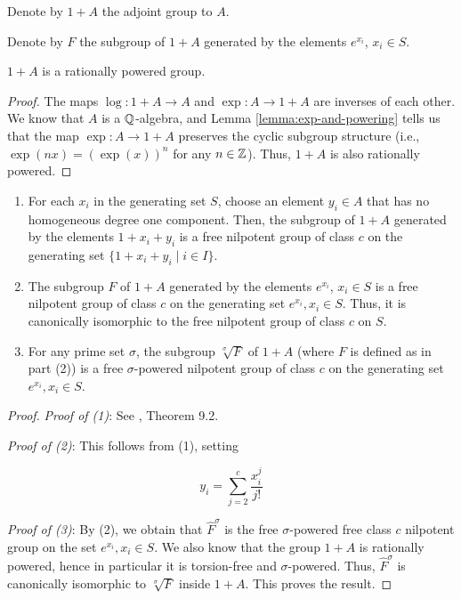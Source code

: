 Denote by $1 + A$ the adjoint group to $A$.

Denote by $F$ the subgroup of $1 + A$ generated by the elements
$e^{x_i}$, $x_i \in S$.

\begin{lemma}
  $1 + A$ is a rationally powered group.
\end{lemma}

\begin{proof}
  The maps $\log:1 + A \to A$ and $\exp:A \to 1 + A$ are inverses of
  each other. We know that $A$ is a $\mathbb{Q}$-algebra, and Lemma
  \ref{lemma:exp-and-powering} tells us that the map $\exp:A \to 1 +
  A$ preserves the cyclic subgroup structure (i.e., $\exp(nx) =
  (\exp(x))^n$ for any $n \in \mathbb{Z}$). Thus, $1 + A$ is also rationally
  powered.
\end{proof}
  
\begin{theorem}\label{thm:free-nilpotent}
  \begin{enumerate}
  \item For each $x_i$ in the generating set $S$, choose an element $y_i
    \in A$ that has no homogeneous degree one component. Then, the
    subgroup of $1 + A$ generated by the elements $1 + x_i + y_i$ is a
    free nilpotent group of class $c$ on the generating set $\{ 1 +
    x_i + y_i \mid i \in I \}$.
  \item The subgroup $F$ of $1 + A$ generated by the elements
    $e^{x_i}$, $x_i \in S$ is a free nilpotent group of class $c$ on
    the generating set $e^{x_i}, x_i \in S$. Thus, it is canonically
    isomorphic to the free nilpotent group of class $c$ on $S$.
  \item For any prime set $\sigma$, the subgroup $\sqrt[\sigma]{F}$ of
    $1 + A$ (where $F$ is defined as in part (2)) is a free
    $\sigma$-powered nilpotent group of class $c$ on the generating
    set $e^{x_i}, x_i \in S$.
  \end{enumerate}
\end{theorem}

\begin{proof}
  {\em Proof of (1)}: See \cite{Khukhro}, Theorem 9.2.

  {\em Proof of (2)}: This follows from (1), setting

  $$y_i = \sum_{j=2}^c \frac{x_i^j}{j!}$$

  {\em Proof of (3)}: By (2), we obtain that $\hat{F}^\sigma$ is the
  free $\sigma$-powered free class $c$ nilpotent group on the set
  $e^{x_i}, x_i \in S$. We also know that the group $1 + A$ is
  rationally powered, hence in particular it is torsion-free and
  $\sigma$-powered. Thus, $\hat{F}^\sigma$ is canonically isomorphic
  to $\sqrt[\sigma]{F}$ inside $1 + A$. This proves the result.
\end{proof}

